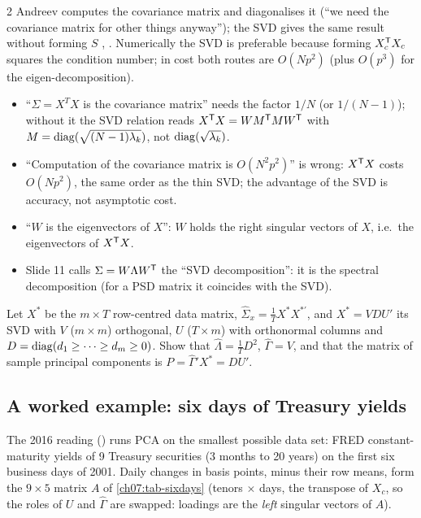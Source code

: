\begin{paracol}{2}
Andreev computes the covariance matrix and diagonalises it (``we need the covariance matrix for other
things anyway''); the SVD gives the same result without forming $S$ , .
Numerically the SVD is preferable because forming $X_c^{\mathsf T} X_c$ squares the condition number; in cost both
routes are $O(Np^2)$ (plus $O(p^3)$ for the eigen-decomposition).

\begin{coursenote}
\begin{itemize}
  \item ``$\Sigma=X^TX$ is the covariance matrix'' needs the factor $1/N$ (or $1/(N-1)$); without it the SVD
      relation reads $X^{\mathsf T} X=W M^{\mathsf T} MW^{\mathsf T}$ with $M=\operatorname{diag}(\sqrt{(N-1)\lambda_k})$, not $\operatorname{diag}(\sqrt{\lambda_k})$.
  \item ``Computation of the covariance matrix is $O(N^2p^2)$'' is wrong: $X^{\mathsf T} X$ costs $O(Np^2)$, the same order as
      the thin SVD; the advantage of the SVD is accuracy, not asymptotic cost.
  \item ``$W$ is the eigenvectors of
      $X$'': $W$ holds the right singular vectors of $X$, i.e.\ the eigenvectors of $X^{\mathsf T} X$.
  \item Slide 11 calls
      $\Sigma=W\Lambda W^{\mathsf T}$ the ``SVD decomposition'': it is the spectral decomposition (for a PSD matrix it coincides with the SVD).
\end{itemize}
\end{coursenote}

\begin{exercise}\label{ch07:ex-lecsvd}
Let $X^*$ be the $m\times T$ row-centred data matrix, $\hat\Sigma_x=\frac1TX^*X^{*\prime}$, and $X^*=VDU'$ its SVD with $V$ ($m\times m$)
orthogonal, $U$ ($T\times m$) with orthonormal columns and $D=\operatorname{diag}(d_1\ge\dots\ge d_m\ge0)$. Show that
$\hat\Lambda=\frac1TD^2$, $\hat\Gamma=V$, and that the matrix of sample principal components is $P=\hat\Gamma'X^*=DU'$.
\end{exercise}

\subsection{A worked example: six days of Treasury yields}\label{ch07:sec-sixdays}
The 2016 reading () runs PCA on the smallest possible data set: FRED constant-maturity
yields of 9 Treasury securities (3 months to 20 years) on the first six business days of 2001. Daily
changes in basis points, minus their row means, form the $9\times5$ matrix $A$ of \cref{ch07:tab-sixdays}
(tenors $\times$ days, the transpose of $X_c$, so the roles of $U$ and $\hat\Gamma$ are swapped: loadings are the
\emph{left} singular vectors of $A$).


\end{paracol}
